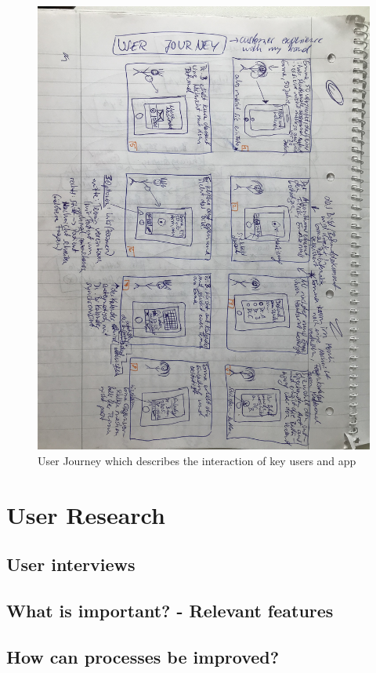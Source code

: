 \begin{figure}[h!]
	\centering
	\includegraphics[width=1\textwidth]{images/userjourney.jpg}
	\caption{User Journey which describes the interaction of key users and app}
	\label{verticallatter}
\end{figure}

\section{User Research}
\subsection{User interviews}
\subsection{What is important? - Relevant features}
\subsection{How can processes be improved?}


